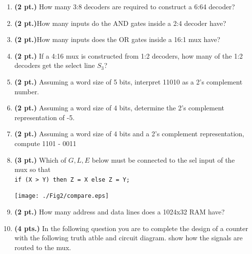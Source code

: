 \documentclass{article}
\begin{document}
\begin{enumerate}
\item {\bf (2 pt.)} How many 3:8 decoders are required to construct a 6:64 decoder?
\vspace{0.3in}

\item {\bf (2 pt.)}How many inputs do the AND gates inside a 2:4 decoder have?
\vspace{0.3in}

\item {\bf (2 pt.)}How many inputs does the OR gates inside a 16:1 mux have?
\vspace{0.3in}

\item {\bf (2 pt.)} If a 4:16 mux is constructed from 1:2 decoders, how
many of the 1:2 decoders get the select line $S_3$?
\vspace{0.3in}

\item {\bf (2 pt.)} Assuming a word size of 5 bits, interpret 11010 as a 2's complement
number.
\vspace{0.3in}


\item {\bf (2 pt.)} Assuming a word size of 4 bits, determine the 2's complement
representation of -5.
\vspace{0.3in}

\item {\bf (2 pt.)} Assuming a word size of 4 bits and a 2's complement representation,
compute  1101 - 0011
\vspace{0.3in}

\pagebreak
\item {\bf (3 pt.)} Which of $G,L,E$ below must be connected to the 
sel input of the mux so that \\
\verb+if (X > Y) then Z = X else Z = Y;+

\texttt{[image: ./Fig2/compare.eps]}
\vspace{0.3in}


\item {\bf (2 pt.)} How many address and data lines does a 1024x32 RAM have?
\vspace{0.3in}

\item{\bf (4 pts.)}
In the following question you are to complete the design of a counter with
the following truth atble and circuit diagram.  show how the signals are
routed to the mux.  

\begin{tabular}{lr}


\end{tabular}
\end{enumerate}
\end{document}
